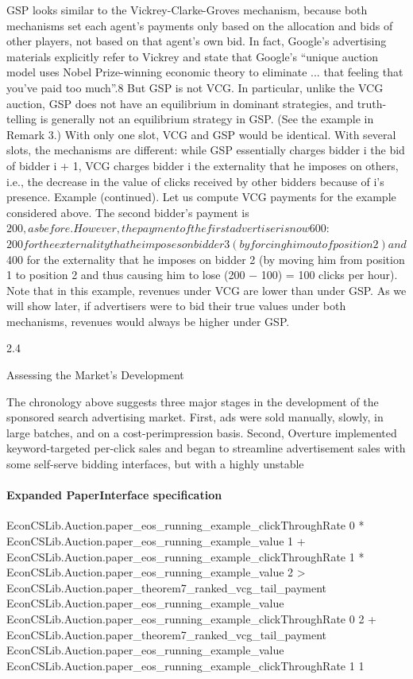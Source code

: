 \documentclass[10pt]{article}
\begin{document}
\begin{ReviewVerbatim}
GSP looks similar to the Vickrey-Clarke-Groves mechanism, because both mechanisms set each
agent’s payments only based on the allocation and bids of other players, not based on that agent’s
own bid. In fact, Google’s advertising materials explicitly refer to Vickrey and state that Google’s
“unique auction model uses Nobel Prize-winning economic theory to eliminate ... that feeling that
you’ve paid too much”.8 But GSP is not VCG. In particular, unlike the VCG auction, GSP does
not have an equilibrium in dominant strategies, and truth-telling is generally not an equilibrium
strategy in GSP. (See the example in Remark 3.) With only one slot, VCG and GSP would be
identical. With several slots, the mechanisms are different: while GSP essentially charges bidder i
the bid of bidder i + 1, VCG charges bidder i the externality that he imposes on others, i.e., the
decrease in the value of clicks received by other bidders because of i’s presence.
Example (continued). Let us compute VCG payments for the example considered above.
The second bidder’s payment is $200, as before. However, the payment of the first advertiser is now
$600: $200 for the externality that he imposes on bidder 3 (by forcing him out of position 2) and
$400 for the externality that he imposes on bidder 2 (by moving him from position 1 to position
2 and thus causing him to lose (200 − 100) = 100 clicks per hour). Note that in this example,
revenues under VCG are lower than under GSP. As we will show later, if advertisers were to bid
their true values under both mechanisms, revenues would always be higher under GSP.

2.4

Assessing the Market’s Development

The chronology above suggests three major stages in the development of the sponsored search
advertising market. First, ads were sold manually, slowly, in large batches, and on a cost-perimpression basis. Second, Overture implemented keyword-targeted per-click sales and began to
streamline advertisement sales with some self-serve bidding interfaces, but with a highly unstable
\end{ReviewVerbatim}


\paragraph{Expanded PaperInterface specification}
\begin{ReviewVerbatim}
EconCSLib.Auction.paper_eos_running_example_clickThroughRate 0 * EconCSLib.Auction.paper_eos_running_example_value 1 +
    EconCSLib.Auction.paper_eos_running_example_clickThroughRate 1 *
      EconCSLib.Auction.paper_eos_running_example_value 2 >
  EconCSLib.Auction.paper_theorem7_ranked_vcg_tail_payment EconCSLib.Auction.paper_eos_running_example_value
      EconCSLib.Auction.paper_eos_running_example_clickThroughRate 0 2 +
    EconCSLib.Auction.paper_theorem7_ranked_vcg_tail_payment EconCSLib.Auction.paper_eos_running_example_value
      EconCSLib.Auction.paper_eos_running_example_clickThroughRate 1 1
\end{ReviewVerbatim}
\end{document}
